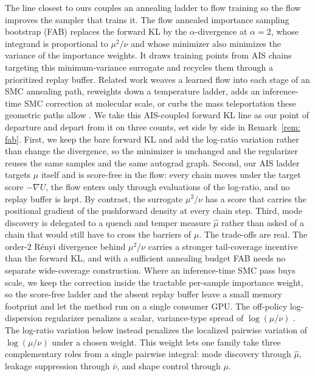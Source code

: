 \documentclass{article}
\begin{document}
The line closest to ours couples an annealing ladder to flow training so the flow improves the sampler that trains it. The flow annealed importance sampling bootstrap (FAB) \citep{midgley2022flow} replaces the forward KL by the $\alpha$-divergence at $\alpha=2$, whose integrand is proportional to $\mu^2/\nu$ and whose minimizer also minimizes the variance of the importance weights. It draws training points from AIS chains targeting this minimum-variance surrogate and recycles them through a prioritized replay buffer. Related work weaves a learned flow into each stage of an SMC annealing path, reweights down a temperature ladder, adds an inference-time SMC correction at molecular scale, or curbs the mass teleportation these geometric paths allow \citep{arbel2021annealed,matthews2022craft,schopmans2025temperature,tan2025sequential,vonklitzing2026constrained}. We take this AIS-coupled forward KL line as our point of departure and depart from it on three counts, set side by side in Remark~\ref{rem: fab}. First, we keep the bare forward KL and add the log-ratio variation rather than change the divergence, so the minimizer is unchanged and the regularizer reuses the same samples and the same autograd graph. Second, our AIS ladder targets $\mu$ itself and is score-free in the flow: every chain moves under the target score $-\nabla U$, the flow enters only through evaluations of the log-ratio, and no replay buffer is kept. By contrast, the surrogate $\mu^2/\nu$ has a score that carries the positional gradient of the pushforward density at every chain step. Third, mode discovery is delegated to a quench and temper measure $\hat\mu$ rather than asked of a chain that would still have to cross the barriers of $\mu$. The trade-offs are real. The order-$2$ Rényi divergence behind $\mu^2/\nu$ carries a stronger tail-coverage incentive than the forward KL, and with a sufficient annealing budget FAB needs no separate wide-coverage construction. Where an inference-time SMC pass buys scale, we keep the correction inside the tractable per-sample importance weight, so the score-free ladder and the absent replay buffer leave a small memory footprint and let the method run on a single consumer GPU. The off-policy log-dispersion regularizer penalizes a scalar, variance-type spread of $\log(\mu/\nu)$ \citep{schopmans2026ldr}. The log-ratio variation below instead penalizes the localized pairwise variation of $\log(\mu/\nu)$ under a chosen weight. This weight lets one family take three complementary roles from a single pairwise integral: mode discovery through $\hat\mu$, leakage suppression through $\bar\nu$, and shape control through $\mu$.
\end{document}
